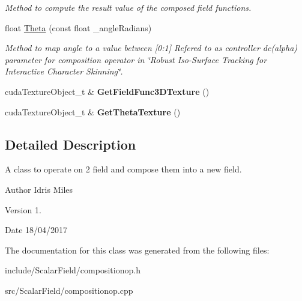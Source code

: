 \begin{DoxyCompactItemize}
\begin{DoxyCompactList}\small\item\em Method to compute the result value of the composed field functions. \end{DoxyCompactList}\item 
float \hyperlink{classCompositionOp_a402a1e7857bd812c016b10b4303a0367}{Theta} (const float \+\_\+angle\+Radians)\hypertarget{classCompositionOp_a402a1e7857bd812c016b10b4303a0367}{}\label{classCompositionOp_a402a1e7857bd812c016b10b4303a0367}

\begin{DoxyCompactList}\small\item\em Method to map angle to a value between \mbox{[}0\+:1\mbox{]} Refered to as controller dc(alpha) parameter for composition operator in \char`\"{}\+Robust Iso-\/\+Surface Tracking for Interactive Character Skinning\char`\"{}. \end{DoxyCompactList}\item 
cuda\+Texture\+Object\+\_\+t \& {\bfseries Get\+Field\+Func3\+D\+Texture} ()\hypertarget{classCompositionOp_a572988818063a3b9dfdd620931be8f43}{}\label{classCompositionOp_a572988818063a3b9dfdd620931be8f43}

\item 
cuda\+Texture\+Object\+\_\+t \& {\bfseries Get\+Theta\+Texture} ()\hypertarget{classCompositionOp_a99e17507ff89a76d313e7acf36667937}{}\label{classCompositionOp_a99e17507ff89a76d313e7acf36667937}

\end{DoxyCompactItemize}


\subsection{Detailed Description}
A class to operate on 2 field and compose them into a new field. 

\begin{DoxyAuthor}{Author}
Idris Miles 
\end{DoxyAuthor}
\begin{DoxyVersion}{Version}
1. 
\end{DoxyVersion}
\begin{DoxyDate}{Date}
18/04/2017 
\end{DoxyDate}


The documentation for this class was generated from the following files\+:\begin{DoxyCompactItemize}
\item 
include/\+Scalar\+Field/compositionop.\+h\item 
src/\+Scalar\+Field/compositionop.\+cpp\end{DoxyCompactItemize}
